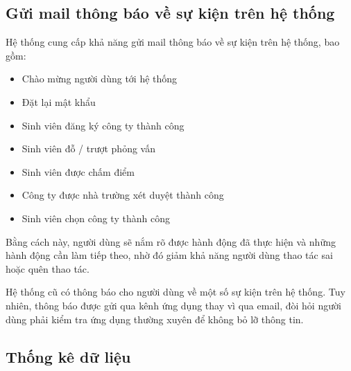 \documentclass[./../main.tex]{subfiles}
\begin{document}
\hypertarget{gux1eedi-mail-thuxf4ng-buxe1o-vux1ec1-sux1ef1-kiux1ec7n-truxean-hux1ec7-thux1ed1ng}{%
\subsection{Gửi mail thông báo về sự kiện trên hệ
thống}\label{gux1eedi-mail-thuxf4ng-buxe1o-vux1ec1-sux1ef1-kiux1ec7n-truxean-hux1ec7-thux1ed1ng}}

Hệ thống cung cấp khả năng gửi mail thông báo về sự kiện trên hệ thống,
bao gồm:

\begin{itemize}
\item
  
  Chào mừng người dùng tới hệ thống
  
\item
  
  Đặt lại mật khẩu
  
\item
  
  Sinh viên đăng ký công ty thành công
  
\item
  
  Sinh viên đỗ / trượt phỏng vấn
  
\item
  
  Sinh viên được chấm điểm
  
\item
  
  Công ty được nhà trường xét duyệt thành công
  
\item
  
  Sinh viên chọn công ty thành công
  
\end{itemize}

Bằng cách này, người dùng sẽ nắm rõ được hành động đã thực hiện và những
hành động cần làm tiếp theo, nhờ đó giảm khả năng người dùng thao tác
sai hoặc quên thao tác.

Hệ thống cũ có thông báo cho người dùng về một số sự kiện trên hệ thống.
Tuy nhiên, thông báo được gửi qua kênh ứng dụng thay vì qua email, đòi
hỏi người dùng phải kiểm tra ứng dụng thường xuyên để không bỏ lỡ thông
tin.

\hypertarget{thux1ed1ng-kuxea-dux1eef-liux1ec7u}{%
\subsection{Thống kê dữ
liệu}\label{thux1ed1ng-kuxea-dux1eef-liux1ec7u}}
\end{document}
